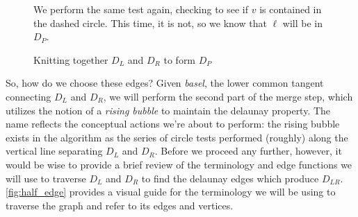 \documentclass[12pt,twoside]{reedthesis}
\begin{document}
    \begin{figure}[!h]
      \ContinuedFloat
      \begin{subtable}{\textwidth}
        \centering
        
        \caption{We perform the same test again, checking to see if $v$ is contained in the dashed circle. This time, it is not, so we know that $\ell$ will be in $D_{P}$.}
        \label{fig:del_knit8}
      \end{subtable}
      

      \caption{Knitting together $D_{L}$ and $D_{R}$ to form $D_{P}$}
      \label{fig:del_knit_all}
    \end{figure}



  So, how do we choose these edges? Given \emph{basel}, the lower common tangent connecting $D_{L}$ and $D_{R}$, we will perform the second part of the merge step, which utilizes the notion of a \emph{rising bubble} to maintain the delaunay property. The name reflects the conceptual actions we're about to perform: the rising bubble exists in the algorithm as the series of circle tests performed (roughly) along the vertical line separating $D_{L}$ and $D_{R}$. Before we proceed any further, however, it would be wise to provide a brief review of the terminology and edge functions we will use to traverse $D_{L}$ and $D_{R}$ to find the delaunay edges which produce $D_{LR}$. \cref{fig:half_edge} provides a visual guide for the terminology we will be using to traverse the graph and refer to its edges and vertices.
\end{document}
